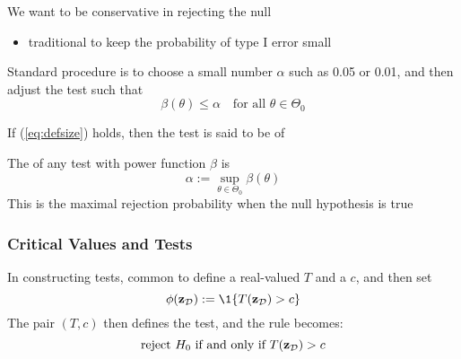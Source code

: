 \begin{frame}

    \vspace{2em}
    We want to be conservative in rejecting the
    null
    \begin{itemize}
        \item traditional to keep the probability of type I error small 
    \end{itemize}
    
    \vspace{.7em}
    Standard procedure is to choose a small number $\alpha$ such as
    0.05 or 0.01, and then adjust the test such that
    \begin{equation}
        \label{eq:defsize}
        \beta(\theta) \leq \alpha
        \quad \text{for all } \theta \in \Theta_0
    \end{equation}
    
    If (\ref{eq:defsize}) holds, then the test is said to be of 
\end{frame}


\begin{frame}
    
    \vspace{2em}
    The  of any test with power function $\beta$ is
    \begin{equation*}
        \label{eq:defsize2*}
        \alpha := \sup_{\theta \in \Theta_0} \beta(\theta) 
    \end{equation*}
    This is the maximal rejection probability when the null hypothesis is true
    
\end{frame}


\begin{frame}\frametitle{Critical Values and Tests}

    \vspace{2em}
    In constructing tests, common to 
    define a real-valued  $T$ and a  $c$, and then
    set 
    \begin{equation}
        \label{eq:tfftc}
        \phi(\zdata) := \1\{T(\zdata) > c\}
    \end{equation}
    The pair $(T, c)$ then defines the test, and the rule becomes: 
    \begin{equation*}
        \text{reject $H_0$ if and only if } T(\mathbf{z}_{\mathcal D}) > c 
    \end{equation*}
    
\end{frame}

